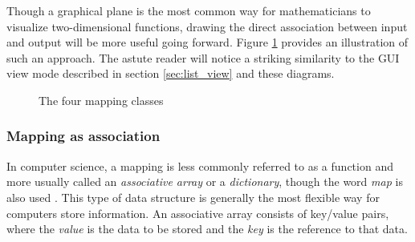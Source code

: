 Though a graphical plane is the most common way for mathematicians to visualize two-dimensional functions, drawing the direct association between input and output will be more useful going forward. Figure \ref{fig:types_of_mapping} provides an illustration of such an approach. The astute reader will notice a striking similarity to the GUI view mode described in section \ref{sec:list_view} and these diagrams.  

\begin{figure}[ht]
\centering
\caption{The four mapping classes}
\label{fig:types_of_mapping}
\end{figure}

	\subsubsection{Mapping as association}

In computer science, a mapping is less commonly referred to as a function and more usually called an \emph{associative array} or a \emph{dictionary}, though the word \emph{map} is also used \cite{data_structures}. This type of data structure is generally the most flexible way for computers store information. An associative array consists of key/value pairs, where the \emph{value} is the data to be stored and the \emph{key} is the reference to that data. 

